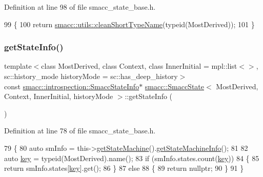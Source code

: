 Definition at line 98 of file smacc\+\_\+state\+\_\+base.\+h.


\begin{DoxyCode}
99   \{
100     \textcolor{keywordflow}{return} \hyperlink{namespacesmacc_1_1utils_aacd1975bb7cd9bec4b50e111a2ae7edb}{smacc::utils::cleanShortTypeName}(\textcolor{keyword}{typeid}(MostDerived));
101   \}
\end{DoxyCode}
\mbox{\label{classsmacc_1_1SmaccState_ab7825f5db39dcbee4e4384913026d3e2}} 
\subsubsection{\texorpdfstring{get\+State\+Info()}{getStateInfo()}}
{\footnotesize\ttfamily template$<$class Most\+Derived, class Context, class Inner\+Initial = mpl\+::list$<$$>$, sc\+::history\+\_\+mode history\+Mode = sc\+::has\+\_\+deep\+\_\+history$>$ \\
const \hyperlink{classsmacc_1_1introspection_1_1SmaccStateInfo}{smacc\+::introspection\+::\+Smacc\+State\+Info}$\ast$ \hyperlink{classsmacc_1_1SmaccState}{smacc\+::\+Smacc\+State}$<$ Most\+Derived, Context, Inner\+Initial, history\+Mode $>$\+::get\+State\+Info (\begin{DoxyParamCaption}{ }\end{DoxyParamCaption})\hspace{0.3cm}{\ttfamily [inline]}}



Definition at line 78 of file smacc\+\_\+state\+\_\+base.\+h.


\begin{DoxyCode}
79   \{
80     \textcolor{keyword}{auto} smInfo = this->\hyperlink{classsmacc_1_1SmaccState_afc39f8e0ca4001b2159a100da2fccd0e}{getStateMachine}().\hyperlink{classsmacc_1_1ISmaccStateMachine_a3b1facb0477325fe43b447fc21d9eb7d}{getStateMachineInfo}();
81 
82     \textcolor{keyword}{auto} \hyperlink{namespacekeyboard__server__node_af0ebd8a9e1564ddc13a227c727602466}{key} = \textcolor{keyword}{typeid}(MostDerived).name();
83     \textcolor{keywordflow}{if} (smInfo.states.count(\hyperlink{namespacekeyboard__server__node_af0ebd8a9e1564ddc13a227c727602466}{key}))
84     \{
85       \textcolor{keywordflow}{return} smInfo.states[\hyperlink{namespacekeyboard__server__node_af0ebd8a9e1564ddc13a227c727602466}{key}].get();
86     \}
87     \textcolor{keywordflow}{else}
88     \{
89       \textcolor{keywordflow}{return} \textcolor{keyword}{nullptr};
90     \}
91   \}
\end{DoxyCode}
\mbox{\label{classsmacc_1_1SmaccState_afc39f8e0ca4001b2159a100da2fccd0e}} 
